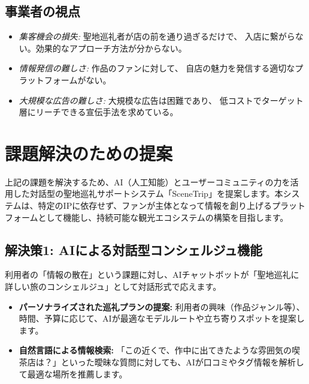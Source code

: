 \documentclass{docs}
\begin{document}
\subsection{事業者の視点}
\begin{itemize}
	\item \emph{集客機会の損失:} 聖地巡礼者が店の前を通り過ぎるだけで、
	入店に繋がらない。効果的なアプローチ方法が分からない。
	\item \emph{情報発信の難しさ:} 作品のファンに対して、
	自店の魅力を発信する適切なプラットフォームがない。
	\item \emph{大規模な広告の難しさ:} 大規模な広告は困難であり、
	低コストでターゲット層にリーチできる宣伝手法を求めている。
\end{itemize}

\section{課題解決のための提案}
上記の課題を解決するため、AI（人工知能）とユーザーコミュニティの力を活用した対話型の聖地巡礼サポートシステム「SceneTrip」を提案します。本システムは、特定のIPに依存せず、ファンが主体となって情報を創り上げるプラットフォームとして機能し、持続可能な観光エコシステムの構築を目指します。

\subsection{解決策1: AIによる対話型コンシェルジュ機能}
利用者の「情報の散在」という課題に対し、AIチャットボットが「聖地巡礼に詳しい旅のコンシェルジュ」として対話形式で応えます。
\begin{itemize}
    \item \textbf{パーソナライズされた巡礼プランの提案:} 利用者の興味（作品ジャンル等）、時間、予算に応じて、AIが最適なモデルルートや立ち寄りスポットを提案します。
    \item \textbf{自然言語による情報検索:} 「この近くで、作中に出てきたような雰囲気の喫茶店は？」といった曖昧な質問に対しても、AIが口コミやタグ情報を解析して最適な場所を推薦します。
\end{itemize}
\end{document}
